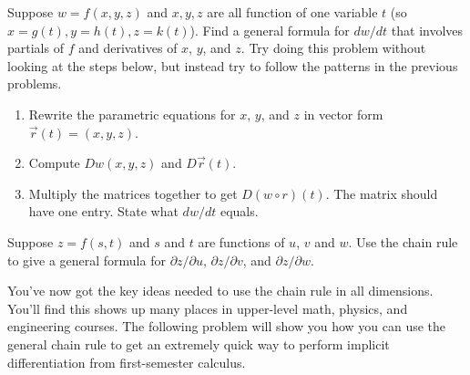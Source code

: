 \begin{problem}%
 Suppose $w=f(x,y,z)$ and $x,y,z$ are all function of one variable $t$ (so $x=g(t), y=h(t), z=k(t)$).  
 Find a general formula for $dw/dt$ that involves partials of $f$ and derivatives of $x$, $y$, and $z$. Try doing this problem without looking at the steps below, but instead try to follow the patterns in the previous problems.
\begin{enumerate}
 \item Rewrite the parametric equations for $x$, $y$, and $z$ in vector form $\vec r(t) = (x,y,z)$.
 \item Compute $Dw(x,y,z)$ and $D\vec r(t)$. 
 \item Multiply the matrices together to get $D(w\circ r)(t)$.  The matrix should have one entry. State what $dw/dt$ equals.
\end{enumerate}
\end{problem}


\begin{problem}%
 Suppose $z=f(s,t)$ and $s$ and $t$ are functions of $u$, $v$ and $w$.  Use the chain rule to give a general formula for $\partial z/\partial u$, $\partial z/\partial v$, and $\partial z/\partial w$. 
\end{problem}

You've now got the key ideas needed to use the chain rule in all dimensions. You'll find this shows up many places in upper-level math, physics, and engineering courses. The following problem will show you how you can use the general chain rule to get an extremely quick way to perform implicit differentiation from first-semester calculus.


